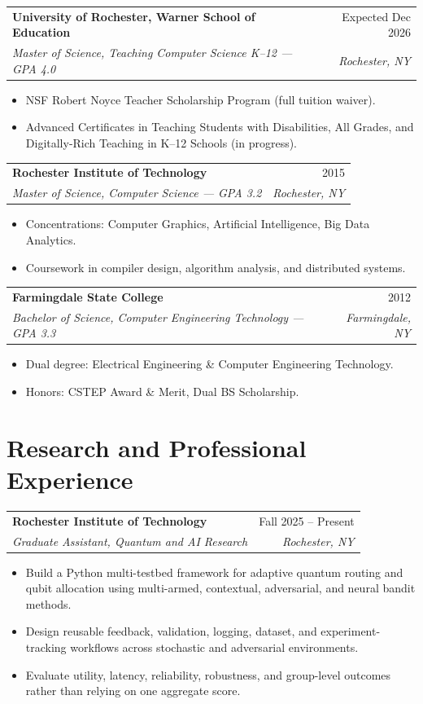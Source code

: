 \documentclass[10pt]{article}
\makeatletter
\newcommand{\entry}[4]{
  \noindent\begin{tabularx}{\textwidth}{@{}Xr@{}}
    \textbf{#1} & #2 \\
    \textit{#3} & \textit{#4}
  \end{tabularx}\vspace{1pt}
}
\makeatother
\begin{document}
\entry{University of Rochester, Warner School of Education}{Expected Dec 2026}{Master of Science, Teaching Computer Science K--12 --- GPA 4.0}{Rochester, NY}
\begin{itemize}
  \item NSF Robert Noyce Teacher Scholarship Program (full tuition waiver).
  \item Advanced Certificates in Teaching Students with Disabilities, All Grades, and Digitally-Rich Teaching in K--12 Schools (in progress).
\end{itemize}

\entry{Rochester Institute of Technology}{2015}{Master of Science, Computer Science --- GPA 3.2}{Rochester, NY}
\begin{itemize}
  \item Concentrations: Computer Graphics, Artificial Intelligence, Big Data Analytics.
  \item Coursework in compiler design, algorithm analysis, and distributed systems.
\end{itemize}

\entry{Farmingdale State College}{2012}{Bachelor of Science, Computer Engineering Technology --- GPA 3.3}{Farmingdale, NY}
\begin{itemize}
  \item Dual degree: Electrical Engineering \& Computer Engineering Technology.
  \item Honors: CSTEP Award \& Merit, Dual BS Scholarship.
\end{itemize}

\section{Research and Professional Experience}

\entry{Rochester Institute of Technology}{Fall 2025 -- Present}{Graduate Assistant, Quantum and AI Research}{Rochester, NY}
\begin{itemize}
  \item Build a Python multi-testbed framework for adaptive quantum routing and qubit allocation using multi-armed, contextual, adversarial, and neural bandit methods.
  \item Design reusable feedback, validation, logging, dataset, and experiment-tracking workflows across stochastic and adversarial environments.
  \item Evaluate utility, latency, reliability, robustness, and group-level outcomes rather than relying on one aggregate score.
\end{itemize}
\end{document}

